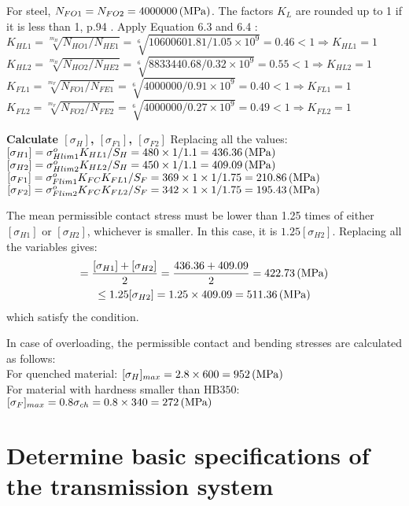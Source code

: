 For steel, $ N_{FO1}= N_{FO2}= 4000000\, (\mathrm{MPa})$. The factors $ K_L $ are rounded up to 1 if it is less than 1, p.94 \cite{tk1}. Apply Equation 6.3 and 6.4 \cite{tk1}:\\
$ K_{HL1} = \sqrt[m_H]{N_{HO1}/N_{HE1}} = \sqrt[6]{10600601.81/1.05 \times10^9} = 0.46 < 1 \Rightarrow K_{HL1} = 1$\\
$ K_{HL2} = \sqrt[m_H]{N_{HO2}/N_{HE2}} = \sqrt[6]{8833440.68/0.32 \times10^9} = 0.55 < 1 \Rightarrow K_{HL2} = 1$\\
$ K_{FL1} = \sqrt[m_F]{N_{FO1}/N_{FE1}} = \sqrt[6]{4000000/0.91 \times10^9} = 0.40 < 1 \Rightarrow K_{FL1} = 1$\\
$ K_{FL2} = \sqrt[m_F]{N_{FO2}/N_{FE2}} = \sqrt[6]{4000000/0.27 \times10^9} = 0.49 < 1 \Rightarrow K_{FL2} = 1$

\textbf{Calculate $ [\sigma_H] $, $ [\sigma_{F1}] $, $ [\sigma_{F2}] $} Replacing all the values:\\
$ [\sigma_{H1}] = \sigma_{Hlim1}^oK_{HL1}/S_H = 480\times 1/1.1 = 436.36 \, (\mathrm{MPa})$\\
$ [\sigma_{H2}] = \sigma_{Hlim2}^oK_{HL2}/S_H = 450\times 1/1.1 = 409.09 \, (\mathrm{MPa})$\\
$ [\sigma_{F1}] = \sigma_{Flim1}^oK_{FC}K_{FL1}/S_{F} = 369\times 1\times 1/1.75  = 210.86\, (\mathrm{MPa})$\\
$ [\sigma_{F2}] = \sigma_{Flim2}^oK_{FC}K_{FL2}/S_{F} = 342\times 1\times 1/1.75  = 195.43 \, (\mathrm{MPa})$

The mean permissible contact stress must be lower than 1.25 times of either $ [\sigma_{H1}] $ or $ [\sigma_{H2}] $, whichever is smaller. In this case, it is $ 1.25[\sigma_{H2}]$. Replacing all the variables gives:
\begin{multline*}
[\sigma_H] =\dfrac{[\sigma_{H1}]+[\sigma_{H2}]}{2}= \dfrac{436.36+409.09}{2} = 422.73 \unitp{MPa}\\
\leq 1.25[\sigma_{H2}] = 1.25\times 409.09= 511.36\unitp{MPa}
\end{multline*}
which satisfy the condition.

In case of overloading, the permissible contact and bending stresses are calculated as follows:\\
For quenched material: $ [\sigma_H]_{max} = 2.8\times 600 = 952\, (\mathrm{MPa}) $\\
For material with hardness smaller than $ \text{HB}350 $: $ [\sigma_F]_{max} = 0.8\sigma_{ch} = 0.8\times 340 = 272\, (\mathrm{MPa}) $

\section{Determine basic specifications of the transmission system}

